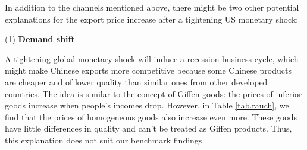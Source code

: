 In addition to the channels mentioned above, there might be two other potential explanations for the export price increase after a tightening US monetary shock:

(1) \textbf{Demand shift} 

A tightening global monetary shock will induce a recession business cycle, which might make Chinese exports more competitive because some Chinese products are cheaper and of lower quality than similar ones from other developed countries. The idea is similar to the concept of Giffen goods: the prices of inferior goods increase when people's incomes drop. However, in Table \ref{tab.rauch}, we find that the prices of homogeneous goods also increase even more. These goods have little differences in quality and can't be treated as Giffen products. Thus, this explanation does not suit our benchmark findings.

